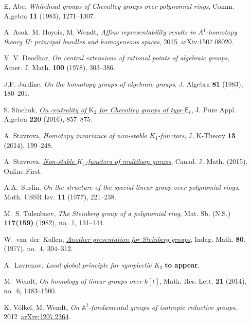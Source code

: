 \documentclass[oneside,12pt]{amsart}
\numberwithin{equation}{section}
\numberwithin{lem}{section}
\theoremstyle{definition}
\theoremstyle{remark}
\newcommand{\Aff}{\mathbb{A}}
\newcommand{\rE}{\mathsf{E}}
\begin{document}
\begin{thebibliography}{MMMM}

 E. Abe,
{\it Whitehead groups of Chevalley groups over polynomial rings},
Comm. Algebra {\bf 11} (1983), 1271--1307.

 A. Asok, M. Hoyois, M. Wendt,
{\it Affine representability results in $A^1$-homotopy theory II: principal bundles and homogeneous spaces},
2015~\href{http://arxiv.org/abs/1507.08020}{arXiv:1507.08020}.

 V. V. Deodhar,
{\it On central extensions of rational points of algebraic groups},
Amer. J. Math. {\bf 100} (1978), 303--386.

 J.F. Jardine,
{\it On the homotopy groups of algebraic groups},
J. Algebra {\bf 81} (1983), 180--201.

 S. Sinchuk,
{\it \href{http://dx.doi.org/10.1016/j.jpaa.2015.08.003}{On centrality of $\mathrm{K}_2$ for {C}hevalley groups of type $\rE_\ell$}},
J. Pure Appl. Algebra {\bf 220} (2016), 857--875.

 A. Stavrova,
{\it Homotopy invariance of non-stable $K_1$-functors},
J. K-Theory {\bf 13} (2014), 199--248.

 A. Stavrova,
{\it \href{http://dx.doi.org/10.4153/CJM-2015-035-2}{Non-stable $K_1$-functors of multiloop groups}},
Canad. J. Math. (2015), Online First.

 A.A.~Suslin,
\emph{On the structure of the special linear group over polynomial rings},
Math. USSR Izv. {\bf 11} (1977), 221--238.

M.~S. Tulenbaev, \emph{The {S}teinberg group of a polynomial ring},
Mat. Sb. (N.S.) \textbf{117(159)} (1982), no.~1, 131--144.

W.~van~der~Kallen, \emph{\href{http://dx.doi.org/10.1016/1385-7258(77)90026-9}{Another presentation for {S}teinberg groups}},
Indag. Math. {\bf 80}, (1977), no.~4, 304--312.

A.~Lavrenov, \emph{Local-global principle for symplectic $K_2$}
{\bf to appear}.

M.~Wendt, \emph{On homology of linear groups over {$k[t]$}},
Math. Res. Lett. \textbf{21} (2014), no.~6, 1483--1500.

 K. V\"olkel, M. Wendt,
{\it On $\Aff^1$-fundamental groups of isotropic reductive groups},
2012~\href{http://arxiv.org/abs/1207.2364}{arXiv:1207.2364}.

\end{thebibliography}
\end{document}

